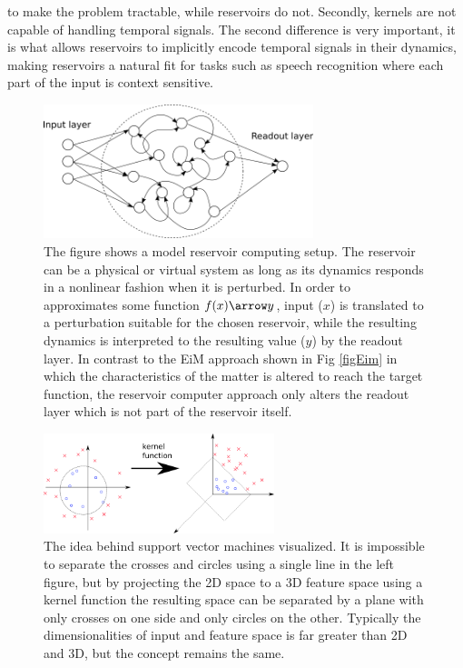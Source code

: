 to make the problem tractable, while reservoirs do not.
Secondly, kernels are not capable of handling temporal signals.
The second difference is very important, it is what allows reservoirs to
implicitly encode temporal signals in their dynamics, making reservoirs a
natural fit for tasks such as speech recognition where each part of the input is
context sensitive.
\begin{figure}[h!]
  \centering
  \includegraphics[width=0.7\textwidth]{fig/reservoirz.png}
  \caption{
    The figure shows a model reservoir computing setup.
    The reservoir can be a physical or virtual system as long as its dynamics
    responds in a nonlinear fashion when it is perturbed. 
    In order to approximates some function $f(x) \arrow y$, input ($x$) is
    translated to a perturbation suitable for the chosen reservoir, while the
    resulting dynamics is interpreted to the resulting value ($y$) by the
    readout layer.
    In contrast to the EiM approach shown in Fig \ref{figEim} in which the
    characteristics of the matter is altered to reach the target function, the
    reservoir computer approach only alters the readout layer which is not part
    of the reservoir itself.
  }
  \label{figRC}
\end{figure}
\begin{figure}[h!]
  \centering
  \includegraphics[width=0.6\textwidth]{fig/svmthing.png}
  \caption{
    The idea behind support vector machines visualized.
    It is impossible to separate the crosses and circles using a single line in
    the left figure, but by projecting the 2D space to a 3D feature space using
    a kernel function the resulting space can be separated by a plane with only
    crosses on one side and only circles on the other.
    Typically the dimensionalities of input and feature space is far greater
    than 2D and 3D, but the concept remains the same.
  }
  \label{figSVM}
\end{figure}
